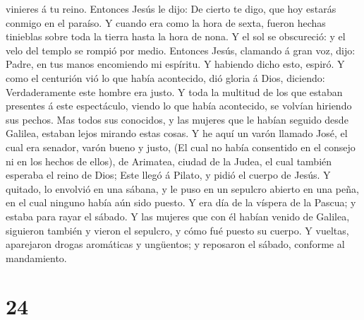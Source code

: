 vinieres á tu reino.  Entonces Jesús le dijo: De cierto
te digo, que hoy estarás conmigo en el paraíso.  Y cuando
era como la hora de sexta, fueron hechas tinieblas sobre toda la tierra
hasta la hora de nona.  Y el sol se obscureció: y el velo
del templo se rompió por medio.  Entonces Jesús, clamando
á gran voz, dijo: Padre, en tus manos encomiendo mi espíritu. Y habiendo
dicho esto, espiró.  Y como el centurión vió lo que había
acontecido, dió gloria á Dios, diciendo: Verdaderamente este hombre era
justo.  Y toda la multitud de los que estaban presentes á
este espectáculo, viendo lo que había acontecido, se volvían hiriendo
sus pechos.  Mas todos sus conocidos, y las mujeres que
le habían seguido desde Galilea, estaban lejos mirando estas cosas.
 Y he aquí un varón llamado José, el cual era senador,
varón bueno y justo,  (El cual no había consentido en el
consejo ni en los hechos de ellos), de Arimatea, ciudad de la Judea, el
cual también esperaba el reino de Dios;  Este llegó á
Pilato, y pidió el cuerpo de Jesús.  Y quitado, lo
envolvió en una sábana, y le puso en un sepulcro abierto en una peña, en
el cual ninguno había aún sido puesto.  Y era día de la
víspera de la Pascua; y estaba para rayar el sábado.  Y
las mujeres que con él habían venido de Galilea, siguieron también y
vieron el sepulcro, y cómo fué puesto su cuerpo.  Y
vueltas, aparejaron drogas aromáticas y ungüentos; y reposaron el
sábado, conforme al mandamiento.

\hypertarget{section-23}{%
\section{24}\label{section-23}}

